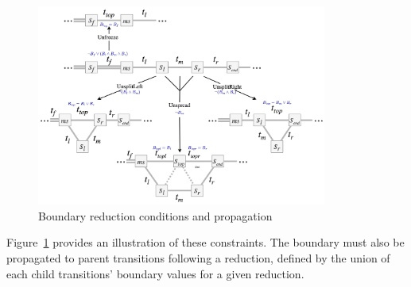 \documentclass[12pt,a4paper,twoside,openany]{report} \usepackage[pdfborder={0 0 0}]{hyperref}    %
\theoremstyle{definition} \newtheorem{definition}{Definition}[section]
\begin{document}
  \begin{figure}[ht] \centering \includegraphics[width=0.85\textwidth]{impl/boundarydiagram/diag.png} \caption{Boundary
  reduction conditions and propagation} \label{fig:parseStateOptions} \end{figure}

  Figure~\ref{fig:parseStateOptions} provides an illustration of these constraints. The boundary must also be propagated
  to parent transitions following a reduction, defined by the union of each child transitions' boundary values for
  a given reduction.

\end{document}
